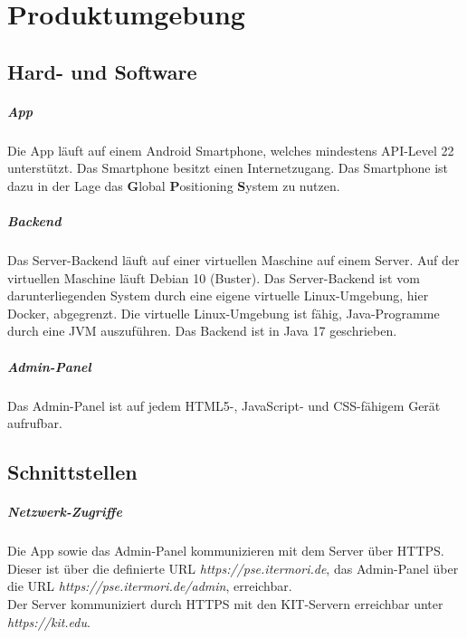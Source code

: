 \newpage
\chapter{Produktumgebung}

\section{Hard- und Software}
    \paragraph{App}
        Die App läuft auf einem Android Smartphone, welches mindestens API-Level 22 unterstützt.
        Das Smartphone besitzt einen Internetzugang.
        Das Smartphone ist dazu in der Lage das \textbf{G}lobal \textbf{P}ositioning \textbf{S}ystem %
            zu nutzen.

    \paragraph{Backend}
        Das Server-Backend läuft auf einer virtuellen Maschine auf einem Server.
        Auf der virtuellen Maschine läuft Debian 10 (Buster).
        Das Server-Backend ist vom darunterliegenden System durch eine eigene virtuelle Linux-Umgebung, hier Docker, abgegrenzt.
        Die virtuelle Linux-Umgebung ist fähig, Java-Programme durch eine JVM auszuführen.
        Das Backend ist in Java 17 geschrieben.

    \paragraph{Admin-Panel}
        Das Admin-Panel ist auf jedem HTML5-, JavaScript- und CSS-fähigem Gerät aufrufbar.

\section{Schnittstellen}
    \paragraph{Netzwerk-Zugriffe}
        Die App sowie das Admin-Panel kommunizieren mit dem Server über HTTPS. Dieser ist über die definierte URL \textit{https://pse.itermori.de},
        das Admin-Panel über die URL \textit{https://pse.itermori.de/admin}, erreichbar. \\
        Der Server kommuniziert durch HTTPS mit den KIT-Servern erreichbar unter \textit{https://kit.edu}.
